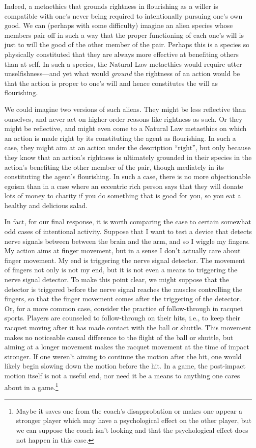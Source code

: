 Indeed, a metaethics that grounds rightness in flourishing as a willer is compatible with one's never being required to intentionally pursuing one's own good.
We can (perhaps with some difficulty) imagine an alien species whose members pair off in such a way that the proper functioning of
each one's will is just to will the good of the other member of the pair. Perhaps this is a species so physically constituted that
they are always more effective at benefiting others than at self. In such a species, the Natural Law metaethics would require 
utter unselfishness---and yet what would \textit{ground} the rightness of an action would be that the action is proper to one's
will and hence constitutes the will as flourishing. 

We could imagine two versions of such aliens. They might be less reflective
than ourselves, and never act on higher-order reasons like rightness as such. Or they might be reflective, and might even come to
a Natural Law metaethics on which an action is made right by its constituting the agent as flourishing. In such a case, they might
aim at an action under the description ``right'', but only because they know that an action's rightness is ultimately grounded in their 
species in the action's benefiting the other member of the pair, though mediately in its constituting the agent's flourishing. 
In such a case, there is no more objectionable egoism than in a case where an eccentric rich person says that they
will donate lots of money to charity if you do something that is good for you, so you eat a healthy and delicious salad. 

In fact, for our final response, it is worth comparing the case to certain somewhat odd cases of intentional activity. Suppose that
I want to test a device that detects nerve signals between between the brain and the arm, and so I wiggle my fingers. My action aims
at finger movement, but in a sense I don't actually care about finger movement. My end is triggering the nerve signal detector.
The movement of fingers not only is not my end, but it is not even a means to triggering the nerve signal detector. To make this
point clear, we might suppose that the detector is triggered before the nerve signal reaches the muscles controlling the fingers,
so that the finger movement comes after the triggering of the detector. Or, for a more common case, consider the practice of
follow-through in racquet sports. Players are counseled to follow-through on their hits, i.e., to keep their racquet moving after 
it has made contact with the ball or shuttle. This movement makes no noticeable causal difference to the flight of the ball or 
shuttle, but aiming at a longer movement makes the racquet movement at the time of impact stronger. If one weren't aiming to continue 
the motion after the hit, one would likely begin slowing down the motion before the hit. In a game, the post-impact motion itself is not 
a useful end, nor need it be a means to anything one cares about in a game.\footnote{Maybe it saves one from the coach's 
disapprobation or makes one appear a stronger player which may have a psychological effect on the other player, but we can suppose the 
coach isn't looking and that the psychological effect does not happen in this case.} 

